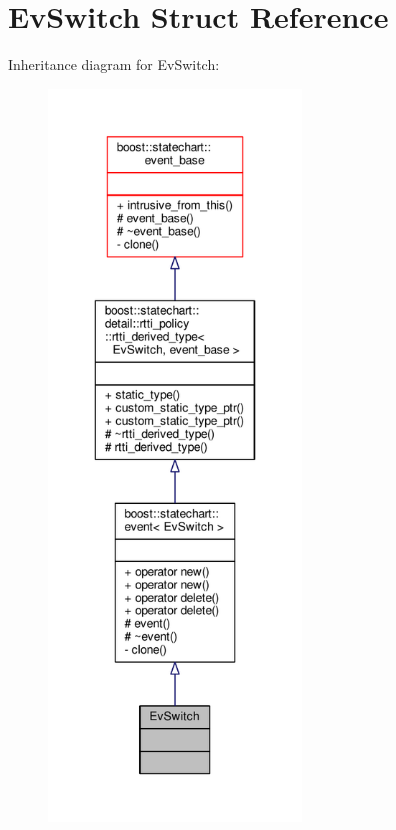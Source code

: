 \hypertarget{struct_ev_switch}{}\section{Ev\+Switch Struct Reference}
\label{struct_ev_switch}


Inheritance diagram for Ev\+Switch\+:
\nopagebreak
\begin{figure}[H]
\begin{center}
\leavevmode
\includegraphics[height=550pt]{struct_ev_switch__inherit__graph}
\end{center}
\end{figure}


